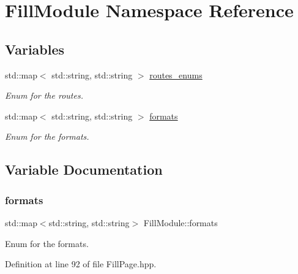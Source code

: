 \hypertarget{namespace_fill_module}{}\section{Fill\+Module Namespace Reference}
\label{namespace_fill_module}
\subsection*{Variables}
\begin{DoxyCompactItemize}
\item 
std\+::map$<$ std\+::string, std\+::string $>$ \hyperlink{namespace_fill_module_a3b04872509f930e4a6282619253fb420}{routes\+\_\+enums}
\begin{DoxyCompactList}\small\item\em Enum for the routes. \end{DoxyCompactList}\item 
std\+::map$<$ std\+::string, std\+::string $>$ \hyperlink{namespace_fill_module_abd8ea40bf0589d3fe6cf7e816164985a}{formats}
\begin{DoxyCompactList}\small\item\em Enum for the formats. \end{DoxyCompactList}\end{DoxyCompactItemize}


\subsection{Variable Documentation}
\mbox{\label{namespace_fill_module_abd8ea40bf0589d3fe6cf7e816164985a}} 
\subsubsection{\texorpdfstring{formats}{formats}}
{\footnotesize\ttfamily std\+::map$<$std\+::string, std\+::string$>$ Fill\+Module\+::formats}



Enum for the formats. 



Definition at line 92 of file Fill\+Page.\+hpp.

\mbox{\label{namespace_fill_module_a3b04872509f930e4a6282619253fb420}} 
